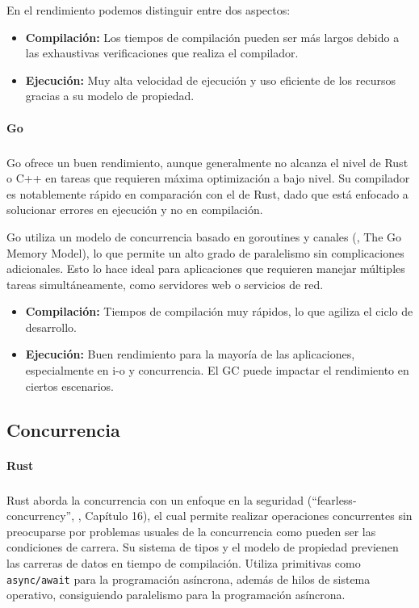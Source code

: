 En el rendimiento podemos distinguir entre dos aspectos:
\begin{itemize}
    \item \textbf{Compilación:} Los tiempos de compilación pueden ser más largos debido a las exhaustivas verificaciones que realiza el compilador.
    \item \textbf{Ejecución:} Muy alta velocidad de ejecución y uso eficiente de los recursos gracias a su modelo de propiedad.
\end{itemize}

\paragraph{Go}
\subparagraph{}

Go ofrece un buen rendimiento, aunque generalmente no alcanza el nivel de Rust o C++ en tareas que requieren máxima optimización a bajo nivel. Su compilador es notablemente rápido en comparación con el de Rust, dado que está enfocado a solucionar errores en ejecución y no en compilación.

Go utiliza un modelo de concurrencia basado en \glspl{goroutine} y canales (\cite{go-documentation}, The Go Memory Model), lo que permite un alto grado de paralelismo sin complicaciones adicionales. Esto lo hace ideal para aplicaciones que requieren manejar múltiples tareas simultáneamente, como servidores web o servicios de red.

\begin{itemize}
    \item \textbf{Compilación:} Tiempos de compilación muy rápidos, lo que agiliza el ciclo de desarrollo.
    \item \textbf{Ejecución:} Buen rendimiento para la mayoría de las aplicaciones, especialmente en \acrshort{i-o} y concurrencia. El GC puede impactar el rendimiento en ciertos escenarios.
\end{itemize}

\subsection{Concurrencia}
\paragraph{Rust}
\subparagraph{}

Rust aborda la concurrencia con un enfoque en la seguridad (``\gls{fearless-concurrency}'', \cite{rustbook2024}, Capítulo 16), el cual permite realizar operaciones concurrentes sin preocuparse por problemas usuales de la concurrencia como pueden ser las condiciones de carrera.
Su sistema de tipos y el modelo de propiedad previenen las carreras de datos en tiempo de compilación.
Utiliza primitivas como \texttt{async/await} para la programación asíncrona, además de hilos de sistema operativo, consiguiendo paralelismo para la programación asíncrona.

